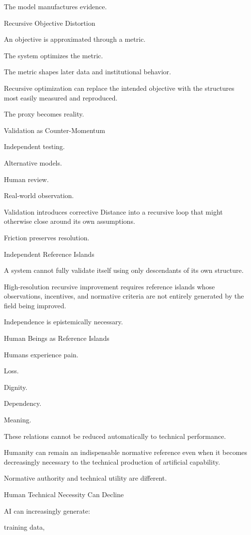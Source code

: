 The model manufactures evidence.

Recursive Objective Distortion

An objective is approximated through a metric.

The system optimizes the metric.

The metric shapes later data and institutional behavior.

Recursive optimization can replace the intended objective with the structures most easily measured and reproduced.

The proxy becomes reality.

Validation as Counter-Momentum

Independent testing.

Alternative models.

Human review.

Real-world observation.

Validation introduces corrective Distance into a recursive loop that might otherwise close around its own assumptions.

Friction preserves resolution.

Independent Reference Islands

A system cannot fully validate itself using only descendants of its own structure.

High-resolution recursive improvement requires reference islands whose observations, incentives, and normative criteria are not entirely generated by the field being improved.

Independence is epistemically necessary.

Human Beings as Reference Islands

Humans experience pain.

Loss.

Dignity.

Dependency.

Meaning.

These relations cannot be reduced automatically to technical performance.

Humanity can remain an indispensable normative reference even when it becomes decreasingly necessary to the technical production of artificial capability.

Normative authority and technical utility are different.

Human Technical Necessity Can Decline

AI can increasingly generate:

training data,

